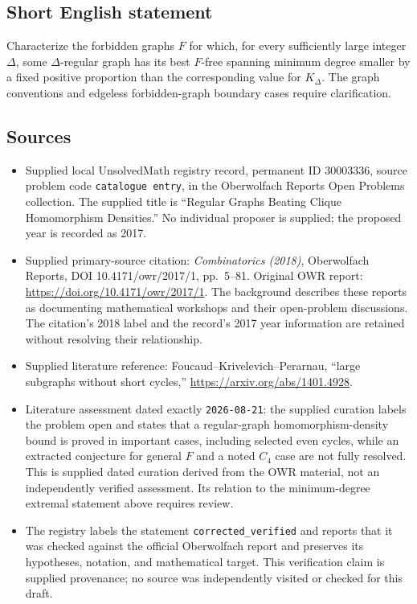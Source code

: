\documentclass[11pt]{article}
\begin{document}
\subsection{Short English statement}
Characterize the forbidden graphs \(F\) for which, for every sufficiently large integer \(\Delta\), some \(\Delta\)-regular graph has its best \(F\)-free spanning minimum degree smaller by a fixed positive proportion than the corresponding value for \(K_\Delta\). The graph conventions and edgeless forbidden-graph boundary cases require clarification.
\subsection{Sources}
\begin{itemize}
\item Supplied local UnsolvedMath registry record, permanent ID \(30003336\), source problem code \texttt{catalogue entry}, in the Oberwolfach Reports Open Problems collection. The supplied title is ``Regular Graphs Beating Clique Homomorphism Densities.'' No individual proposer is supplied; the proposed year is recorded as 2017.
\item Supplied primary-source citation: \emph{Combinatorics (2018)}, Oberwolfach Reports, DOI 10.4171/owr/2017/1, pp.\ 5--81. Original OWR report: \url{https://doi.org/10.4171/owr/2017/1}. The background describes these reports as documenting mathematical workshops and their open-problem discussions. The citation's 2018 label and the record's 2017 year information are retained without resolving their relationship.
\item Supplied literature reference: Foucaud--Krivelevich--Perarnau, ``large subgraphs without short cycles,'' \url{https://arxiv.org/abs/1401.4928}.
\item Literature assessment dated exactly \texttt{2026-08-21}: the supplied curation labels the problem open and states that a regular-graph homomorphism-density bound is proved in important cases, including selected even cycles, while an extracted conjecture for general \(F\) and a noted \(C_4\) case are not fully resolved. This is supplied dated curation derived from the OWR material, not an independently verified assessment. Its relation to the minimum-degree extremal statement above requires review.
\item The registry labels the statement \texttt{corrected\_verified} and reports that it was checked against the official Oberwolfach report and preserves its hypotheses, notation, and mathematical target. This verification claim is supplied provenance; no source was independently visited or checked for this draft.
\end{itemize}
\end{document}

